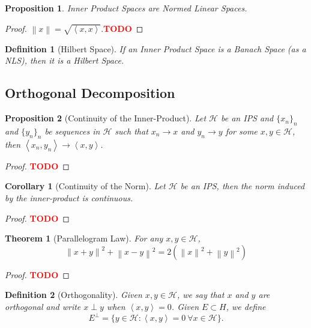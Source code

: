 \documentclass{article}
\newtheorem*{theorem}{Theorem}
\newtheorem*{corollary}{Corollary}
\newtheorem*{proposition}{Proposition}
\newtheorem*{definition}{Definition}
\renewcommand{\H}{\mathcal{H}}
\newcommand{\inner}[2]{\left\langle#1 , #2 \right\rangle}
\newcommand{\norm}[1]{\left\lVert#1 \right\rVert}
\newcommand{\td}{\textcolor{red}{\textbf{TODO}}}
\begin{document}
\begin{proposition}
    Inner Product Spaces are Normed Linear Spaces.
\end{proposition}

\begin{proof}
    $\norm{x} = \sqrt{\inner{x}{x}}$.\td
\end{proof}

\begin{definition}[Hilbert Space]
    If an Inner Product Space is a Banach Space (as a NLS), then it is a Hilbert Space.
\end{definition}

\subsection{Orthogonal Decomposition}

\begin{proposition}[Continuity of the Inner-Product]
    Let $\H$ be an IPS and $\{x_n\}_n$ and $\{y_n\}_n$ be sequences in $\H$ such that $x_n \rightarrow x$ and $y_n \rightarrow y$ for some $x,y \in \H$, then $\inner{x_n}{y_n} \rightarrow \inner{x}{y}$.
\end{proposition}

\begin{proof}
    \td 
\end{proof}

\begin{corollary}[Continuity of the Norm]
    Let $\H$ be an IPS, then the norm induced by the inner-product is continuous.
\end{corollary}

\begin{proof}
    \td 
\end{proof}

\begin{theorem}[Parallelogram Law]
    For any $x,y \in \H$,
    $$\norm{x+y}^2 + \norm{x - y}^2 = 2(\norm{x}^2 + \norm{y}^2)$$
\end{theorem}

\begin{proof}
    \td 
\end{proof}

\begin{definition}[Orthogonality]
    Given $x,y \in \H$, we say that $x$ and $y$ are orthogonal and write $x \perp y$ when $\inner{x}{y} = 0$. Given $E \subset H$, we define
    $$E^{\perp} = \{y \in \H : \inner{x}{y} = 0 \ \forall x \in \H\}.$$
\end{definition}
\end{document}

